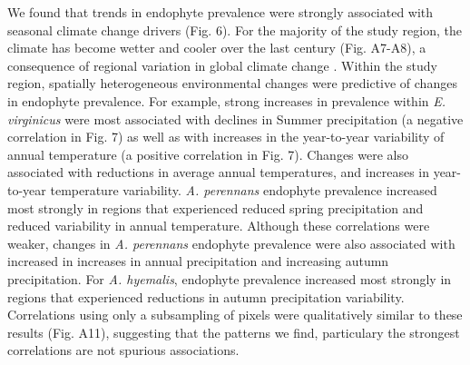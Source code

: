 \documentclass[11pt]{article}
\let\cite\citep
\newcommand{\tom}[2]{{\color{red}{#1}}\footnote{\textit{\color{red}{#2}}}}
\begin{document}
We found that trends in endophyte prevalence were strongly associated with seasonal climate change drivers (Fig. 6).
For the majority of the study region, the climate has become wetter and cooler over the last century (Fig. A7-A8), a consequence of regional variation in global climate change \cite{ipcc_2021}. 
Within the study region, spatially heterogeneous environmental changes were predictive of changes in endophyte prevalence. 
For example, strong increases in prevalence within \emph{E. virginicus} were most associated with declines in Summer precipitation  (a negative correlation in Fig. 7) as well as with increases in the year-to-year variability of annual temperature (a positive correlation in Fig. 7). 
Changes were also associated with reductions in average annual temperatures, and increases in year-to-year temperature variability.
\emph{A. perennans} endophyte prevalence increased most strongly in regions that experienced reduced spring precipitation and reduced variability in annual temperature.
Although these correlations were weaker, changes in \emph{A. perennans} endophyte prevalence were also associated with increased in increases in annual precipitation and increasing autumn precipitation. 
For \emph{A. hyemalis}, endophyte prevalence increased most strongly in regions that experienced reductions in autumn precipitation variability. 
Correlations using only a subsampling of pixels were qualitatively similar to these results (Fig. A11), suggesting that the patterns we find, particulary the strongest correlations are not spurious associations.

\end{document}
